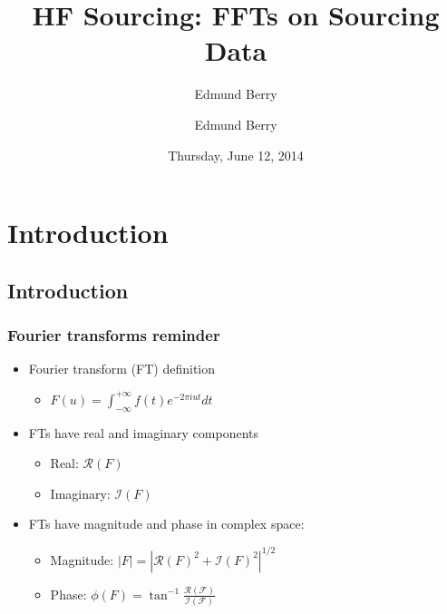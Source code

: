 \documentclass[bigger]{beamer}
\institute[Brown University]{\inst{1} Brown University}
\title{HF Sourcing: \newline FFTs on Sourcing Data}
\author{Edmund Berry}
\date{Thursday, June 12, 2014}
\author[Edmund Berry]{\alert{Edmund Berry}\inst{1}}
\begin{document}
\maketitle


\section{Introduction}
\label{sec-1}
\subsection{Introduction}
\label{sec-1-1}
\begin{frame}
\frametitle{Fourier transforms reminder}
\label{sec-1-1-1}
\begin{itemize}

\item Fourier transform (FT) definition
\label{sec-1-1-1-1}%
\begin{itemize}

\item \(F(u) = \int_{-\infty}^{+\infty}f(t)e^{-2\pi i u t} dt\)
\label{sec-1-1-1-1-1}%
\end{itemize} %

\item FTs have real and imaginary components
\label{sec-1-1-1-2}%
\begin{itemize}

\item Real: \(\mathcal{R}(F)\)
\label{sec-1-1-1-2-1}%

\item Imaginary: \(\mathcal{I}(F)\)
\label{sec-1-1-1-2-2}%
\end{itemize} %

\item FTs have magnitude and phase in complex space:
\label{sec-1-1-1-3}%
\begin{itemize}

\item Magnitude: \(|F| = |\mathcal{R}(F)^{2} + \mathcal{I}(F)^{2}|^{1/2}\)
\label{sec-1-1-1-3-1}%

\item Phase: \(\phi(F) = \tan^{-1}\frac{\mathcal{R(F)}}{\mathcal{I(F)}}\)
\label{sec-1-1-1-3-2}%
\end{itemize} %
\end{itemize} %
\end{frame}
\end{document}
